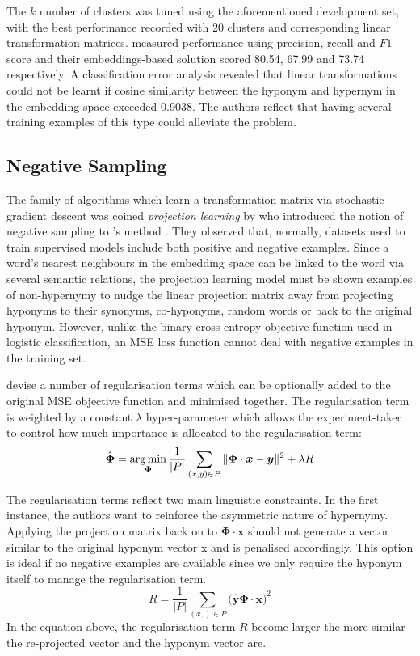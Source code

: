 The $k$ number of clusters was tuned using the aforementioned development set, with the best performance recorded with 20 clusters and corresponding linear transformation matrices.  \citeauthor{Fu2014} measured performance using precision, recall and $F1$ score and their embeddings-based solution scored 80.54, 67.99 and 73.74 respectively.  A classification error analysis revealed that linear transformations could not be learnt if cosine similarity between the hyponym and hypernym in the embedding space exceeded 0.9038.  The authors reflect that having several training examples of this type could alleviate the problem.

\subsection{Negative Sampling}
The family of algorithms which learn a transformation matrix via stochastic gradient descent was coined \textit{projection learning} by 
\citeauthor{ustalov2017negative} who introduced the notion of negative sampling to \citeauthor{Fu2014}'s method \citep{ustalov2017negative}.  They observed that, normally, datasets used to train supervised models include both positive and negative examples.  Since a word’s nearest neighbours in the embedding space can be linked to the word via several semantic relations, the projection learning model must be shown examples of non-hypernymy to nudge the linear projection matrix away from projecting hyponyms to their synonyms, co-hyponyms, random words or back to the original hyponym.  However, unlike the binary cross-entropy objective function used in logistic classification, an \ac{MSE} loss function cannot deal with negative examples in the training set.

\citeauthor{ustalov2017negative} devise a number of regularisation terms which can be optionally added to the original \ac{MSE} objective function and minimised together.  The regularisation term is weighted by a constant $\lambda$ hyper-parameter which allows the experiment-taker to control how much importance is allocated to the regularisation term:
\[\hat{\bm{\Phi}} = \operatorname*{arg\,min}_{\bm{\Phi}} \frac{1}{\vert P \vert} \sum_{(x,y) \in P} \Vert \bm{\Phi}\cdot\bm{x} - \bm {y} \Vert^2 + \lambda R\]

The regularisation terms reflect two main linguistic constraints.  In the first instance, the authors want to reinforce the asymmetric nature of hypernymy.  Applying the projection matrix back on to $\bm{\Phi} \cdot \bm{x}$ should not generate a vector similar to the original hyponym vector x and is penalised accordingly.  This option is ideal if no negative examples are available since we only require the hyponym itself to manage the regularisation term.
\[R = \frac{1}{\vert P \vert} \sum_{(x,) \in P} \big( \hat{\bm{y}} \bm{\Phi} \cdot \bm{x} \big)^2  \]
In the equation above, the regularisation term $R$ become larger the more similar the re-projected vector and the hyponym vector are. 

